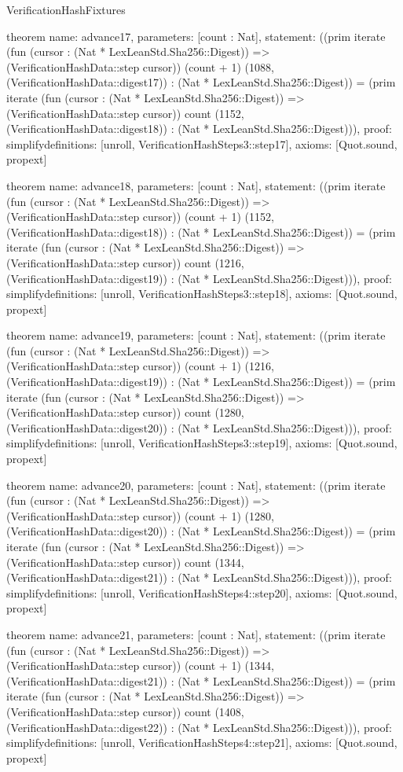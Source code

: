 \begin{lexlean}{VerificationHashFixtures}
\begin{semanticmodule}
theorem{
  name: advance17,
  parameters: [count : Nat],
  statement: ((prim iterate (fun (cursor : (Nat * LexLeanStd.Sha256::Digest)) => (VerificationHashData::step cursor)) (count + 1) (1088, (VerificationHashData::digest17)) : (Nat * LexLeanStd.Sha256::Digest)) = (prim iterate (fun (cursor : (Nat * LexLeanStd.Sha256::Digest)) => (VerificationHashData::step cursor)) count (1152, (VerificationHashData::digest18)) : (Nat * LexLeanStd.Sha256::Digest))),
  proof: simplify{definitions: [unroll, VerificationHashSteps3::step17]},
  axioms: [Quot.sound, propext]
}

theorem{
  name: advance18,
  parameters: [count : Nat],
  statement: ((prim iterate (fun (cursor : (Nat * LexLeanStd.Sha256::Digest)) => (VerificationHashData::step cursor)) (count + 1) (1152, (VerificationHashData::digest18)) : (Nat * LexLeanStd.Sha256::Digest)) = (prim iterate (fun (cursor : (Nat * LexLeanStd.Sha256::Digest)) => (VerificationHashData::step cursor)) count (1216, (VerificationHashData::digest19)) : (Nat * LexLeanStd.Sha256::Digest))),
  proof: simplify{definitions: [unroll, VerificationHashSteps3::step18]},
  axioms: [Quot.sound, propext]
}

theorem{
  name: advance19,
  parameters: [count : Nat],
  statement: ((prim iterate (fun (cursor : (Nat * LexLeanStd.Sha256::Digest)) => (VerificationHashData::step cursor)) (count + 1) (1216, (VerificationHashData::digest19)) : (Nat * LexLeanStd.Sha256::Digest)) = (prim iterate (fun (cursor : (Nat * LexLeanStd.Sha256::Digest)) => (VerificationHashData::step cursor)) count (1280, (VerificationHashData::digest20)) : (Nat * LexLeanStd.Sha256::Digest))),
  proof: simplify{definitions: [unroll, VerificationHashSteps3::step19]},
  axioms: [Quot.sound, propext]
}

theorem{
  name: advance20,
  parameters: [count : Nat],
  statement: ((prim iterate (fun (cursor : (Nat * LexLeanStd.Sha256::Digest)) => (VerificationHashData::step cursor)) (count + 1) (1280, (VerificationHashData::digest20)) : (Nat * LexLeanStd.Sha256::Digest)) = (prim iterate (fun (cursor : (Nat * LexLeanStd.Sha256::Digest)) => (VerificationHashData::step cursor)) count (1344, (VerificationHashData::digest21)) : (Nat * LexLeanStd.Sha256::Digest))),
  proof: simplify{definitions: [unroll, VerificationHashSteps4::step20]},
  axioms: [Quot.sound, propext]
}

theorem{
  name: advance21,
  parameters: [count : Nat],
  statement: ((prim iterate (fun (cursor : (Nat * LexLeanStd.Sha256::Digest)) => (VerificationHashData::step cursor)) (count + 1) (1344, (VerificationHashData::digest21)) : (Nat * LexLeanStd.Sha256::Digest)) = (prim iterate (fun (cursor : (Nat * LexLeanStd.Sha256::Digest)) => (VerificationHashData::step cursor)) count (1408, (VerificationHashData::digest22)) : (Nat * LexLeanStd.Sha256::Digest))),
  proof: simplify{definitions: [unroll, VerificationHashSteps4::step21]},
  axioms: [Quot.sound, propext]
}


\end{semanticmodule}
\end{lexlean}
